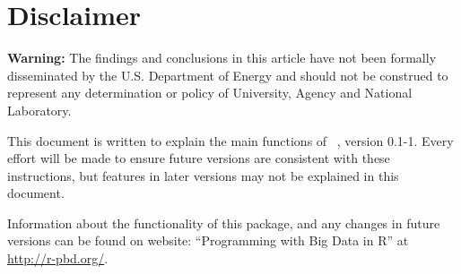 \chapter*{Disclaimer}

{\color{red} \bf Warning:}
The findings and conclusions in this article have not been
formally disseminated by the U.S. Department of Energy
and should not be construed to represent any determination or
policy of University, Agency and National Laboratory.

This document is written to explain the main
functions of ~\citep{Schmidt2013pbdDEMOpackage}, version 0.1-1.
Every effort will be made to ensure future versions are consistent with
these instructions, but features in later versions may not be explained
in this document.

Information about the functionality of this package,
and any changes in future versions can be found on website:
``Programming with Big Data in R'' at
\url{http://r-pbd.org/}.

